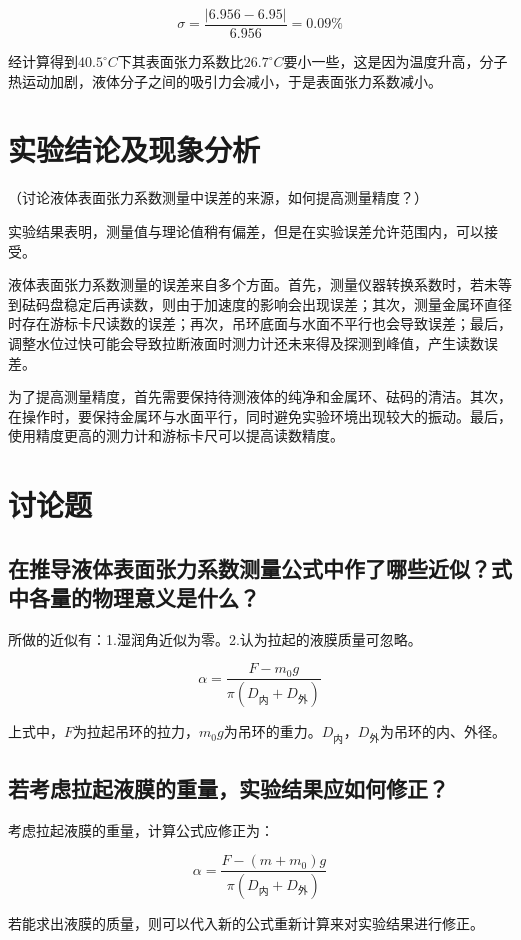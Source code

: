 \documentclass{ctexart}
\begin{document}
$$ \sigma = \frac{\vert 6.956-6.95 \vert}{6.956} = 0.09\% $$

经计算得到$40.5^\circ C$下其表面张力系数比$26.7^\circ C$要小一些，这是因为温度升高，分子热运动加剧，液体分子之间的吸引力会减小，于是表面张力系数减小。

\section{实验结论及现象分析}
（讨论液体表面张力系数测量中误差的来源，如何提高测量精度？）

实验结果表明，测量值与理论值稍有偏差，但是在实验误差允许范围内，可以接受。

液体表面张力系数测量的误差来自多个方面。首先，测量仪器转换系数时，若未等到砝码盘稳定后再读数，则由于加速度的影响会出现误差；其次，测量金属环直径时存在游标卡尺读数的误差；再次，吊环底面与水面不平行也会导致误差；最后，调整水位过快可能会导致拉断液面时测力计还未来得及探测到峰值，产生读数误差。

为了提高测量精度，首先需要保持待测液体的纯净和金属环、砝码的清洁。其次，在操作时，要保持金属环与水面平行，同时避免实验环境出现较大的振动。最后，使用精度更高的测力计和游标卡尺可以提高读数精度。

\section{讨论题}
\subsection{在推导液体表面张力系数测量公式中作了哪些近似？式中各量的物理意义是什么？}

所做的近似有：1.湿润角近似为零。2.认为拉起的液膜质量可忽略。

$$\alpha = \frac{F-m_0g}{\pi (D_{\text{内}}+D_{\text{外}})}$$

上式中，$F$为拉起吊环的拉力，$m_0g$为吊环的重力。$D_{\text{内}}，D_{\text{外}}$为吊环的内、外径。

\subsection{若考虑拉起液膜的重量，实验结果应如何修正？}
考虑拉起液膜的重量，计算公式应修正为：

$$\alpha = \frac{F-(m+m_0)g}{\pi (D_{\text{内}}+D_{\text{外}})}$$

若能求出液膜的质量，则可以代入新的公式重新计算来对实验结果进行修正。 
\end{document}
